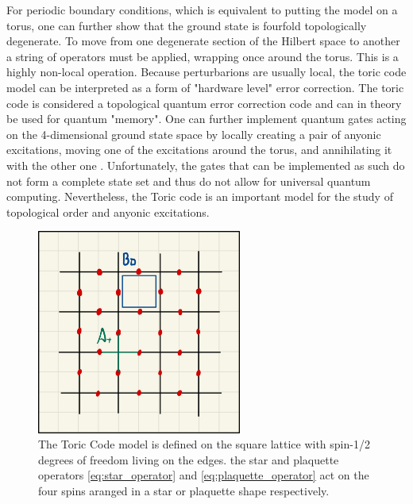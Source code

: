 For periodic boundary conditions, which is equivalent to putting the model on a torus, one can further show that the ground state is fourfold topologically degenerate. To move from one degenerate section of the Hilbert space to another a string of operators must be applied, wrapping once around the torus. This is a highly non-local operation. Because perturbarions are usually local, the toric code model can be interpreted as a form of "hardware level" error correction. The toric code is considered a topological quantum error correction code and can in theory be used for quantum "memory". One can further implement quantum gates acting on the 4-dimensional ground state space by locally creating a pair of anyonic excitations, moving one of the excitations around the torus, and annihilating it with the other one \cite{cite:fault_tolerant_quantum_computation_by_anyons}. Unfortunately, the gates that can be implemented as such do not form a complete state set and thus do not allow for universal quantum computing. Nevertheless, the Toric code is an important model for the study of topological order and anyonic excitations.
\begin{figure}
	\centering
	\includegraphics[width=0.6\textwidth]{figures/Toric_Code/toric_code_star_and_plaquette_operator.jpeg}
	\caption{The Toric Code model is defined on the square lattice with spin-1/2 degrees of freedom living on the edges. the star and plaquette operators \eqref{eq:star_operator} and \eqref{eq:plaquette_operator} act on the four spins aranged in a star or plaquette shape respectively.}
	\label{fig:toric_code_star_and_plaquette_operators}
\end{figure}
